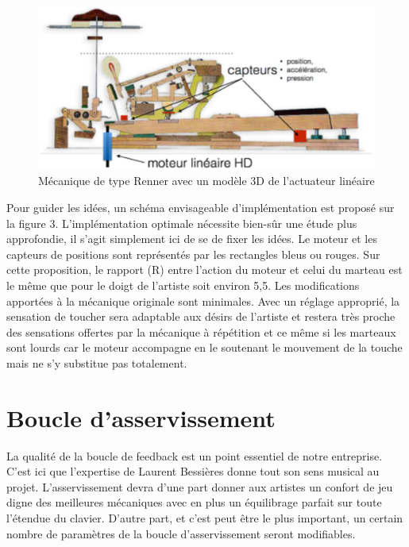 \documentclass[french,a4paper,12pt]{report}
\begin{document}
	\begin{figure}[!ht]
    \center
   \includegraphics[width=15cm]{MECA_PIANO3.png}
    \caption{Mécanique de type Renner avec un modèle 3D de l’actuateur linéaire}
		\end{figure}


Pour guider les idées, un schéma envisageable d’implémentation est proposé sur la figure 3. L’implémentation optimale nécessite bien-sûr une étude plus approfondie, il s’agit simplement ici de se de fixer les idées. Le moteur et les capteurs de positions sont représentés par les rectangles bleus ou rouges. Sur cette proposition, le rapport (R) entre l’action du moteur et celui du marteau est le même que pour le doigt de l’artiste soit environ 5,5. Les modifications apportées à la mécanique originale sont minimales. Avec un réglage approprié, la sensation
de toucher sera adaptable aux désirs de l’artiste et restera très proche des sensations offertes par la mécanique à répétition et ce même si les marteaux sont lourds car le moteur accompagne en le soutenant le mouvement de la touche mais ne s’y substitue pas totalement.

  \section{Boucle d'asservissement}

La qualité de la boucle de feedback est un point essentiel de notre entreprise. C’est ici que l’expertise de Laurent Bessières donne tout son sens musical au projet. L’asservissement devra d’une part donner aux artistes un confort de jeu digne des meilleures mécaniques avec en plus un équilibrage parfait sur toute l’étendue du clavier. D’autre part, et c’est peut être le plus important, un certain nombre de paramètres de la boucle d’asservissement seront modifiables.
\end{document}
